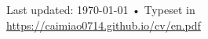 \documentclass[11pt, a4paper]{article}
\begin{document}
\vfill{}

\begin{center}
{\scriptsize  Last updated: \today\- •\- 
Typeset in \href{https://caimiao0714.github.io/cv/en.pdf}{
\XeTeX }\\
\href{https://caimiao0714.github.io/cv/en.pdf}{https://caimiao0714.github.io/cv/en.pdf}}
\end{center}
\end{document}
